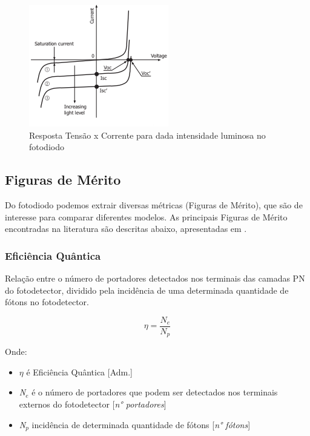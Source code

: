 \begin{figure}[htb]
	\caption{\label{fig_respFotodiodo}Resposta Tensão x Corrente para dada intensidade luminosa no fotodiodo}
	\begin{center}
	    \includegraphics[scale=0.8]{Imagens/graficoRespostaFotodiodo.png}
	\end{center}
\end{figure}

\subsection{Figuras de M\'erito}
Do fotodiodo podemos extrair diversas m\'etricas (Figuras de M\'erito), que são de interesse para comparar diferentes modelos. As principais Figuras de M\'erito encontradas na literatura são descritas abaixo, apresentadas em \cite{LidianeCampos}.

\subsubsection{Eficiência Quântica}
Relação entre o número de portadores detectados nos terminais das camadas PN do fotodetector, dividido pela incidência de uma determinada quantidade de fótons no fotodetector.

\begin{equation}
    \eta = \frac{N_e}{N_p}
\end{equation}

Onde:
\begin{itemize}
    \item \textit{$\eta$} \'e Efici\^encia Qu\^antica [Adm.]
    \item \textit{N$_e$} \'e o n\'umero de portadores que podem ser detectados nos terminais externos do fotodetector [\textit{n° portadores}]
    \item \textit{N$_p$} incid\^encia de determinada quantidade de f\'otons [\textit{n° f\'otons}]
\end{itemize}

